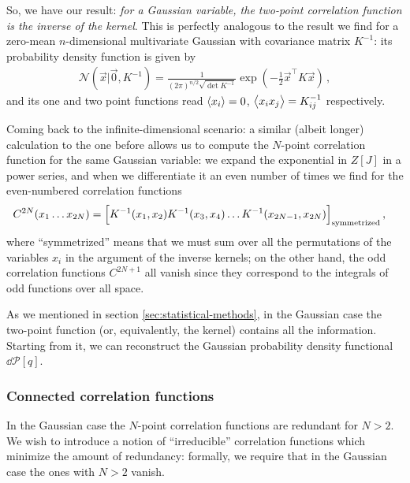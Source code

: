 \documentclass[main.tex]{subfiles}
\begin{document}
So, we have our result: \emph{for a Gaussian variable, the two-point correlation function is the inverse of the kernel}. 
This is perfectly analogous to the result we find for a zero-mean \(n\)-dimensional multivariate Gaussian with covariance matrix \(K^{-1}\): its probability density function is given by 
%
\begin{align}
\mathcal{N}(\vec{x} | \vec{0}, K^{-1}) = 
\frac{1}{(2 \pi )^{n/2} \sqrt{\det K^{-1}}}
\exp(- \frac{1}{2} \vec{x}^{\top} K \vec{x})
\,,
\end{align}
%
and its one and two point functions read \(\expval{x_i} = 0\), \(\expval{x_i x_j} = K^{-1}_{ij}\) respectively. 

Coming back to the infinite-dimensional scenario: a similar (albeit longer) calculation to the one before allows us to compute the \(N\)-point correlation function for the same Gaussian variable: we expand the exponential in \(Z[J]\) in a power series, and when we differentiate it an even number of times we find for the even-numbered correlation functions
%
\begin{align}
C^{2N}(x_1 \dots x_{2N}) &= \qty[K^{-1}(x_1, x_2 ) K^{-1} (x_3, x_4) \dots K^{-1} (x_{2N-1}, x_{2N})]_{\text{symmetrized}}
\,,
\end{align}
%
where ``symmetrized'' means that we must sum over all the permutations of the variables \(x_i\) in the argument of the inverse kernels; on the other hand, the odd correlation functions \(C^{2N+1}\) all vanish since they correspond to the integrals of odd functions over all space.

As we mentioned in section \ref{sec:statistical-methods}, in the Gaussian case the two-point function (or, equivalently, the kernel) contains all the information. 
Starting from it, we can reconstruct the Gaussian probability density functional \(\dd{\mathcal{P}}[q]\). 


\subsubsection{Connected correlation functions}

In the Gaussian case the \(N\)-point correlation functions are redundant for \(N > 2\). We wish to introduce a notion of ``irreducible'' correlation functions which minimize the amount of redundancy: formally, we require that in the Gaussian case the ones with \(N > 2\) vanish. 
\end{document}
